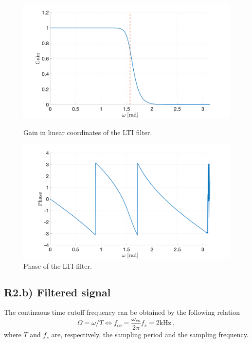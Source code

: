 \documentclass[a4paper, oneside, 11pt]{article}
\begin{document}
\begin{figure}[htbp]
	\centering
	\begin{minipage}[b]{.49\textwidth}
		\centering
		\includegraphics[width= 1.1\textwidth]{figures/R2a_gain.png}
		\caption{Gain in linear coordinates of the LTI filter.}
		\label{fig:R2a_gain}
	\end{minipage}
	\hfill
	\begin{minipage}[b]{.49\textwidth}
		\centering
		\includegraphics[width= 1.1\textwidth]{figures/R2a_phase.png}
		\caption{Phase of the LTI filter.}
		\label{fig:R2a_phase}
	\end{minipage}
\end{figure}

\subsection{R2.b) Filtered signal}
The continuous time cutoff frequency can be obtained by the following relation
\begin{equation*}
\Omega = \omega/T \iff f_{co} = \frac{\omega_{co}}{2\pi}f_s = 2 \text{kHz}\:,
\end{equation*}
where $T$ and $f_s$ are, respectively, the sampling period and the sampling frequency.
\end{document}
